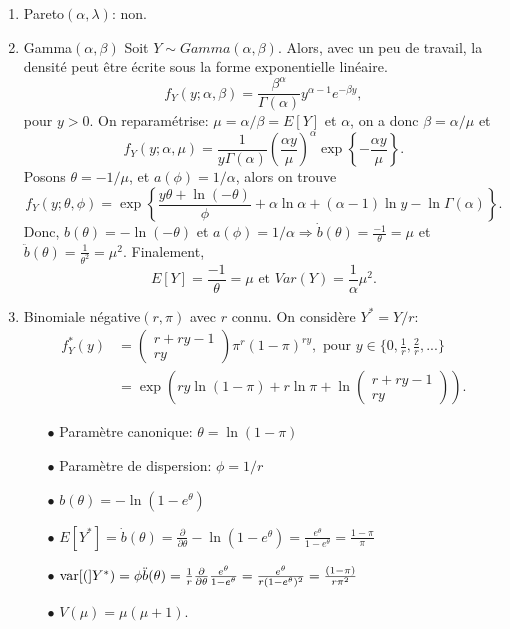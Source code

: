 \begin{solution}{2.1}
\begin{enumerate}
\item Pareto$(\alpha,\lambda)$: non.
\item Gamma$(\alpha,\beta)$
Soit $Y\sim Gamma(\alpha,\beta)$. Alors, avec un peu de travail, la densité peut être écrite sous la forme exponentielle linéaire.
$$f_{Y}(y;\alpha,\beta)=\frac{\beta^{\alpha}}{\Gamma(\alpha)}y^{\alpha-1}e^{-\beta y},$$ pour $y>0$. On reparamétrise: $\mu=\alpha/\beta=E[Y]$ et $\alpha$, on a donc $\beta=\alpha/\mu$ et $$f_{Y}(y;\alpha,\mu)=\frac{1}{y\Gamma(\alpha)}\left(\frac{\alpha y}{\mu}\right)^{\alpha}\exp\left\{-\frac{\alpha y}{\mu}\right\}.$$ Posons $\theta=-1/\mu$, et $a(\phi)=1/\alpha$, alors on trouve $$f_{Y}(y;\theta,\phi)=\exp\left\{\frac{y\theta +\ln(-\theta)}{\phi} +\alpha\ln\alpha+(\alpha-1)\ln y -\ln\Gamma(\alpha)\right\}.$$ Donc, $b(\theta)=-\ln(-\theta)$ et $a(\phi)=1/\alpha \Rightarrow \dot{b}(\theta)=\frac{-1}{\theta}=\mu$ et $\ddot{b}(\theta)=\frac{1}{\theta^{2}}=\mu^{2}$. Finalement, $$E[Y]=\frac{-1}{\theta}=\mu \mbox{ et } Var(Y)=\frac{1}{\alpha}\mu^{2}.$$

\item Binomiale négative$(r,\pi)$ avec $r$ connu. On considère $Y^*=Y/r$:
\begin{align*}
f_Y^*(y)&=\begin{pmatrix} r+ry-1\\ry\end{pmatrix}\pi^r(1-\pi)^{ry}, \mbox{ pour } y\in \{0,\frac{1}{r},\frac{2}{r},...\}\\
&=\exp\left(ry\ln(1-\pi)+r\ln\pi+\ln\begin{pmatrix} r+ry-1\\ry\end{pmatrix}\right).
\end{align*}
\begin{itemize}
\item[$\bullet$] Paramètre canonique: $\theta=\ln(1-\pi)$
\item[$\bullet$] Paramètre de dispersion:  $\phi=1/r$
\item[$\bullet$] $b(\theta)=-\ln(1-e^\theta)$
\item[$\bullet$] $E[Y^*]=\dot{b}(\theta)=\frac{\partial}{\partial\theta}-\ln(1-e^\theta)=\frac{e^{\theta}}{1-e^\theta}=\frac{1-\pi}{\pi}$
\item[$\bullet$] $\mathrm{var} [ ( ]Y^*)=\phi\ddot{b}(\theta)=\frac{1}{r}\frac{\partial}{\partial\theta}\frac{e^{\theta}}{1-e^\theta}=\frac{e^\theta}{r(1-e^\theta)^2}=\frac{(1-\pi)}{r\pi^2}$
\item[$\bullet$] $V(\mu)=\mu(\mu+1)$.
\end{itemize}
\end{enumerate}
\end{solution}
